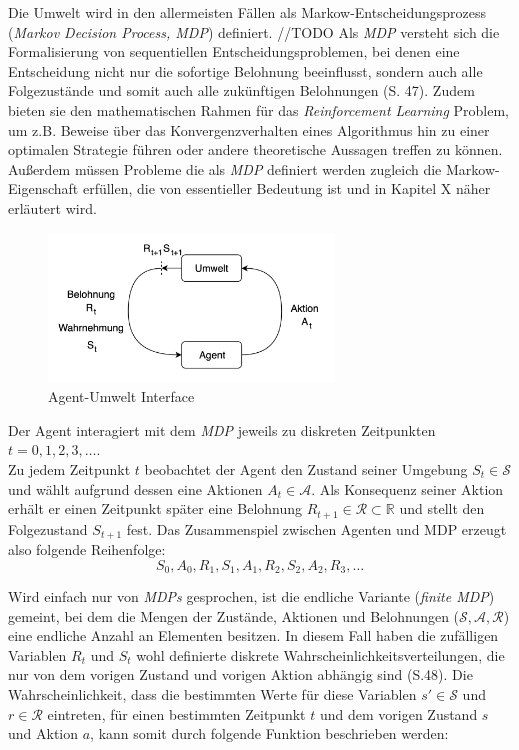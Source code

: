 \par 
Die Umwelt wird in den allermeisten Fällen als Markow-Entscheidungsprozess (\textit{Markov Decision Process, MDP}) definiert. //TODO Als \textit{MDP} versteht sich die Formalisierung von sequentiellen Entscheidungsproblemen, bei denen eine Entscheidung nicht nur die sofortige Belohnung beeinflusst, sondern auch alle Folgezustände und somit auch alle zukünftigen Belohnungen (S. 47). Zudem bieten sie den mathematischen Rahmen für das \textit{Reinforcement Learning} Problem, um z.B. Beweise über das Konvergenzverhalten eines Algorithmus hin zu einer optimalen Strategie führen oder andere theoretische Aussagen treffen zu können. Außerdem müssen Probleme die als \textit{MDP} definiert werden zugleich die Markow-Eigenschaft erfüllen, die von essentieller Bedeutung ist und in Kapitel X näher erläutert wird.
\par 

\begin{figure}[H]
    \centering
    \includegraphics[height=150px]{images/agentUmweltInterface.png}
    \caption{Agent-Umwelt Interface}
\end{figure}


Der Agent interagiert mit dem \textit{MDP} jeweils zu diskreten Zeitpunkten $t = 0, 1, 2, 3, \dots$. \\
Zu jedem Zeitpunkt $t$ beobachtet der Agent den Zustand seiner Umgebung $S_t \in \mathcal{S}$ und wählt aufgrund dessen eine Aktionen $A_t \in \mathcal{A}$. Als Konsequenz seiner Aktion erhält er einen Zeitpunkt später eine Belohnung $R_{t+1} \in \mathcal{R} \subset\mathbb{R} $ und stellt den Folgezustand $S_{t+1}$ fest. Das Zusammenspiel zwischen Agenten und MDP erzeugt also folgende Reihenfolge:
\[S_0, A_0, R_1, S_1, A_1, R_2, S_2, A_2, R_3, \dots\]

Wird einfach nur von \textit{MDPs} gesprochen, ist die endliche Variante (\textit{finite MDP}) gemeint, bei dem die Mengen der Zustände, Aktionen und Belohnungen ($\mathcal{S}, \mathcal{A}, \mathcal{R}$) eine endliche Anzahl an Elementen besitzen. In diesem Fall haben die zufälligen Variablen $R_t$ und $S_t$ wohl definierte diskrete Wahrscheinlichkeitsverteilungen, die nur von dem vorigen Zustand und vorigen Aktion abhängig sind (S.48). Die Wahrscheinlichkeit, dass die bestimmten Werte für diese Variablen $s' \in \mathcal{S}$ und $r \in \mathcal{R}$ eintreten, für einen bestimmten Zeitpunkt $t$ und dem vorigen Zustand $s$ und Aktion $a$, kann somit durch folgende Funktion beschrieben werden:

